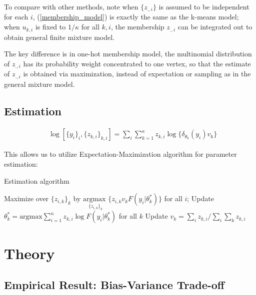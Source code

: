 \documentclass[12pt]{article}
\begin{document}
To compare with other methods, note when $\{z_{.,i}\}$ is assumed to be independent for each $i$, (\ref{membership_model}) is exactly the same as the k-means model; when $u_{k,i}$ is fixed to $1/\kappa$ for all $k,i$, the membership $z_{.,i}$ can be integrated out to obtain general finite mixture model.

The key difference is in one-hot membership model, the multinomial distribution of $z_{.,i}$ has its probability weight concentrated to one vertex, so that the estimate of $z_{.,i}$ is obtained via maximization, instead of expectation or sampling as in the general mixture model.
 
\subsection{Estimation}

\begin{equation}
\begin{aligned}
& \log[ \{y_i\}_i, \{z_{k,i}\}_{k,i} ] =  \sum_{i}\sum_{k=1}^{\kappa} z_{k,i} \log \{\delta_{\theta_{k}}(y_i) v_k \}
\end{aligned}
\label{conditional_lik}
\end{equation}

 This allows us to utilize Expectation-Maximization algorithm for parameter estimation:

\begin{algorithm}[H]
\caption{Estimation algorithm}\label{alg:euclid}
\begin{algorithmic}[1]
\State Maximize over $\{ z_{i,k}\}_k$ by $ \underset{\{z_{i,k}\}_k} {\text{argmax }}\{z_{i,k}  v_{k}F (y_i|\theta^*_k)\}$ for all $i$;
\State Update $\theta^{*}_{k}= \text{argmax} \sum_{i=1}^{n} z_{k,i} \log F(y_i|\theta^*_k) $ for all $k$ 
\State Update $v_{k}=  \sum_{i} z_{k,i} /  \sum_{i}\sum_{k}z_{k,i}$ 
\EndWhile
\end{algorithmic}
\end{algorithm}

\section{Theory}


\subsection{Empirical Result: Bias-Variance Trade-off}
\end{document}
